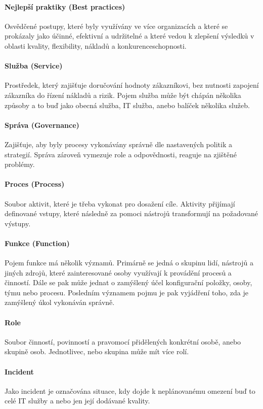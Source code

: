 \documentclass[
  digital,     %
  twoside,     %
  lof,         %
  lot,         %
]{fithesis4}
\begin{document}
\paragraph{Nejlepší praktiky (Best practices)}
Osvědčené postupy, které byly využívány ve více organizacích a které se prokázaly jako účinné, efektivní a udržitelné a které vedou k zlepšení výsledků v oblasti kvality, flexibility, nákladů a konkurenceschopnosti.
\paragraph{Služba (Service)}
Prostředek, který zajišťuje doručování hodnoty zákazníkovi, bez nutnosti zapojení zákazníka do řízení nákladů a rizik. Pojem služba může být chápán několika způsoby a to buď jako obecná služba, IT služba, anebo balíček několika služeb. 
\paragraph{Správa (Governance)}
Zajišťuje, aby byly procesy vykonávány správně dle nastavených politik a strategií. Správa zároveň vymezuje role a odpovědnosti, reaguje na zjištěné problémy.
\paragraph{Proces (Process)}
Soubor aktivit, které je třeba vykonat pro dosažení cíle. Aktivity přijímají definované vstupy, které následně za pomoci nástrojů transformují na požadované výstupy.
\paragraph{Funkce (Function)}
Pojem funkce má několik významů. Primárně se jedná o skupinu lidí, nástrojů a jiných zdrojů, které zainteresované osoby využívají k provádění procesů a činností. Dále se pak může jednat o zamýšlený účel konfigurační položky, osoby, týmu nebo procesu. Posledním významem pojmu je pak vyjádření toho, zda je zamýšlený úkol vykonáván správně. 
\paragraph{Role}
Soubor činností, povinností a pravomocí přidělených konkrétní osobě, anebo skupině osob. Jednotlivec, nebo skupina může mít více rolí.
\paragraph{Incident}
Jako incident je označována situace, kdy dojde k neplánovanému omezení buď to celé IT služby a nebo jen její dodávané kvality.
\end{document}
